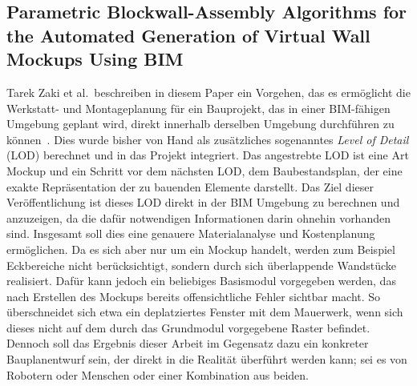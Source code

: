 \subsection{Parametric Blockwall-Assembly Algorithms for the Automated Generation of Virtual Wall Mockups Using BIM}
Tarek Zaki et al.\ beschreiben in diesem Paper ein Vorgehen, das es ermöglicht die Werkstatt- und Montageplanung für ein Bauprojekt, das in einer BIM-fähigen Umgebung geplant wird, direkt innerhalb derselben Umgebung durchführen zu können~\cite{Zaki2017}.
Dies wurde bisher von Hand als zusätzliches sogenanntes \textit{Level of Detail} (LOD) berechnet und in das Projekt integriert.
Das angestrebte LOD ist eine Art Mockup und ein Schritt vor dem nächsten LOD, dem Baubestandsplan, der eine exakte Repräsentation der zu bauenden Elemente darstellt.
Das Ziel dieser Veröffentlichung ist dieses LOD direkt in der BIM Umgebung zu berechnen und anzuzeigen, da die dafür notwendigen Informationen darin ohnehin vorhanden sind.
Insgesamt soll dies eine genauere Materialanalyse und Kostenplanung ermöglichen.
Da es sich aber \glqq{}nur\grqq{} um ein Mockup handelt, werden zum Beispiel Eckbereiche nicht berücksichtigt, sondern durch sich überlappende Wandstücke realisiert.
Dafür kann jedoch ein beliebiges Basismodul vorgegeben werden, das nach Erstellen des Mockups bereits offensichtliche Fehler sichtbar macht.
So überschneidet sich etwa ein deplatziertes Fenster mit dem Mauerwerk, wenn sich dieses nicht auf dem durch das Grundmodul vorgegebene Raster befindet.
Dennoch soll das Ergebnis dieser Arbeit im Gegensatz dazu ein konkreter Bauplanentwurf sein, der direkt in die Realität überführt werden kann; sei es von Robotern oder Menschen oder einer Kombination aus beiden.